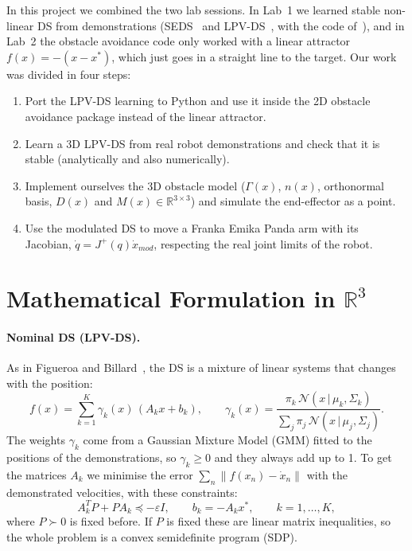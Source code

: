 ﻿\documentclass[10pt,a4paper]{article}
\begin{document}
In this project we combined the two lab sessions. In Lab~1 we learned stable non-linear DS from
demonstrations (SEDS~\cite{khansari2011} and LPV-DS~\cite{figueroa}, with the code of~\cite{code}), and in Lab~2 the obstacle avoidance code only worked with a linear
attractor $f(x)=-(x-x^*)$, which just goes in a straight line to the target. Our work was divided in
four steps:
\begin{enumerate}
\item Port the LPV-DS learning to Python and use it inside the 2D obstacle avoidance package instead of
the linear attractor.
\item Learn a 3D LPV-DS from real robot demonstrations and check that it is stable (analytically and
also numerically).
\item Implement ourselves the 3D obstacle model ($\Gamma(x)$, $n(x)$, orthonormal basis, $D(x)$ and
$M(x)\in\mathbb{R}^{3\times 3}$) and simulate the end-effector as a point.
\item Use the modulated DS to move a Franka Emika Panda arm with its Jacobian,
$\dot q = J^{+}(q)\dot x_{mod}$, respecting the real joint limits of the robot.
\end{enumerate}

\section{Mathematical Formulation in $\mathbb{R}^3$}

\paragraph{Nominal DS (LPV-DS).} As in Figueroa and Billard~\cite{figueroa}, the DS is a mixture of
linear systems that changes with the position:
\begin{equation}
f(x)=\sum_{k=1}^{K}\gamma_k(x)\,(A_k x+b_k),\qquad
\gamma_k(x)=\frac{\pi_k\,\mathcal{N}(x\,|\,\mu_k,\Sigma_k)}{\sum_j \pi_j\,\mathcal{N}(x\,|\,\mu_j,\Sigma_j)} .
\end{equation}
The weights $\gamma_k$ come from a Gaussian Mixture Model (GMM) fitted to the positions of the
demonstrations, so $\gamma_k\ge 0$ and they always add up to 1. To get the matrices $A_k$ we minimise
the error $\sum_n\|f(x_n)-\dot x_n\|$ with the demonstrated velocities, with these constraints:
\begin{equation}
A_k^{T}P+PA_k\preceq-\varepsilon I,\qquad b_k=-A_k x^*,\qquad k=1,\dots,K,
\label{eq:constr}
\end{equation}
where $P\succ 0$ is fixed before. If $P$ is fixed these are linear matrix inequalities, so the whole
problem is a convex semidefinite program (SDP).
\end{document}
